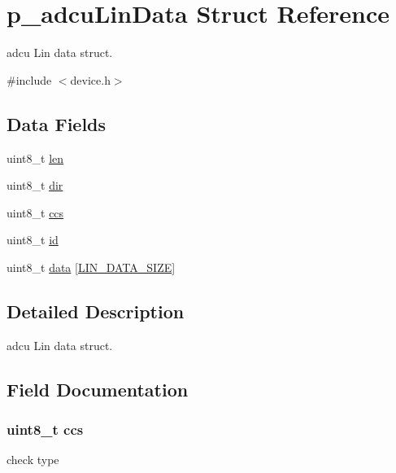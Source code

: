 \hypertarget{structp__adcuLinData}{}\section{p\+\_\+adcu\+Lin\+Data Struct Reference}
\label{structp__adcuLinData}


adcu Lin data struct.  




{\ttfamily \#include $<$device.\+h$>$}

\subsection*{Data Fields}
\begin{DoxyCompactItemize}
\item 
uint8\+\_\+t \hyperlink{structp__adcuLinData_a5723e60ffd628510c699eddbce90be23}{len}
\item 
uint8\+\_\+t \hyperlink{structp__adcuLinData_a92abda0bec7c1c978fe96f87aad18067}{dir}
\item 
uint8\+\_\+t \hyperlink{structp__adcuLinData_a7f744409bf1999626d8d95f1c0439864}{ccs}
\item 
uint8\+\_\+t \hyperlink{structp__adcuLinData_a1e6927fa1486224044e568f9c370519b}{id}
\item 
uint8\+\_\+t \hyperlink{structp__adcuLinData_a87a96d212d536666bdd947f932f22fb1}{data} \mbox{[}\hyperlink{device_8h_a23fcb14d9120ed87b44498eee448a375}{L\+I\+N\+\_\+\+D\+A\+T\+A\+\_\+\+S\+I\+ZE}\mbox{]}
\end{DoxyCompactItemize}


\subsection{Detailed Description}
adcu Lin data struct. 

\subsection{Field Documentation}
\subsubsection[{\texorpdfstring{ccs}{ccs}}]{\setlength{\rightskip}{0pt plus 5cm}uint8\+\_\+t ccs}\hypertarget{structp__adcuLinData_a7f744409bf1999626d8d95f1c0439864}{}\label{structp__adcuLinData_a7f744409bf1999626d8d95f1c0439864}
check type 
